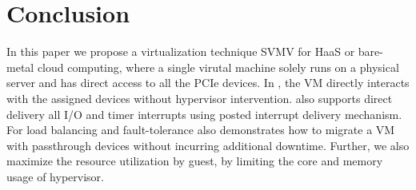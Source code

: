 \section{Conclusion}

In this paper we propose a virtualization technique SVMV
for HaaS or bare-metal cloud computing, where a single 
virutal machine solely runs on a physical server and 
has direct access to all the PCIe devices. In \sna, the VM directly 
interacts with the assigned devices without hypervisor 
intervention. \sna also supports direct delivery all I/O 
and timer interrupts using posted interrupt
delivery mechanism. For load balancing and 
fault-tolerance \sna also demonstrates how 
to migrate a VM with passthrough devices without incurring 
additional downtime. Further, we also maximize the 
resource utilization by guest, by limiting 
the core and memory usage of hypervisor.
